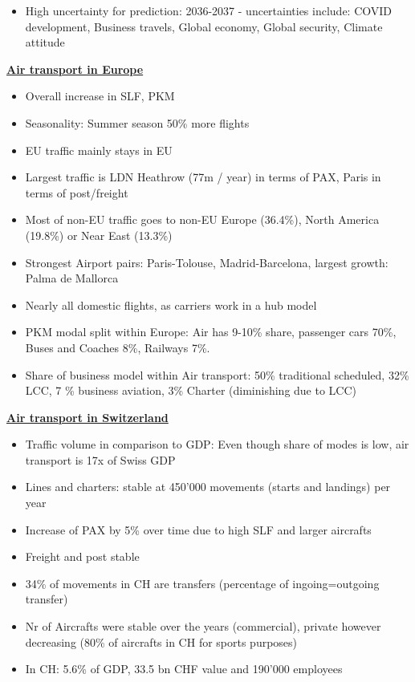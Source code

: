 \documentclass[9pt, landscape, fleqn]{scrartcl}
\begin{document}
\begin{multicols*}{3}
\begin{itemize}
    \item High uncertainty for prediction: 2036-2037 - uncertainties include: COVID development, Business travels, Global economy, Global security, Climate attitude
\end{itemize}
\underline{\textbf{Air transport in Europe}}
\begin{itemize}
    \item Overall increase in SLF, PKM
    \item Seasonality: Summer season 50\% more flights
    \item EU traffic mainly stays in EU
    \item Largest traffic is LDN Heathrow (77m / year) in terms of PAX, Paris in terms of post/freight
    \item Most of non-EU traffic goes to non-EU Europe (36.4\%), North America (19.8\%) or Near East (13.3\%)
    \item Strongest Airport pairs: Paris-Tolouse, Madrid-Barcelona, largest growth: Palma de Mallorca
    \item Nearly all domestic flights, as carriers work in a hub model
    \item PKM modal split within Europe: Air has 9-10\% share, passenger cars 70\%, Buses and Coaches 8\%, Railways 7\%.
    \item Share of business model within Air transport: 50\% traditional scheduled, 32\% LCC, 7 \% business aviation, 3\% Charter (diminishing due to LCC) 
\end{itemize}
\underline{\textbf{Air transport in Switzerland}}
\begin{itemize}
    \item Traffic volume in comparison to GDP: Even though share of modes is low, air transport is 17x of Swiss GDP
    \item Lines and charters: stable at 450'000 movements (starts and landings) per year
    \item Increase of PAX by 5\% over time due to high SLF and larger aircrafts
    \item Freight and post stable
    \item 34\% of movements in CH are transfers (percentage of ingoing=outgoing transfer)
    \item Nr of Aircrafts were stable over the years (commercial), private however decreasing (80\% of aircrafts in CH for sports purposes)
    \item In CH: 5.6\% of GDP, 33.5 bn CHF value and 190'000 employees 
\end{itemize}

\end{multicols*}
\end{document}
